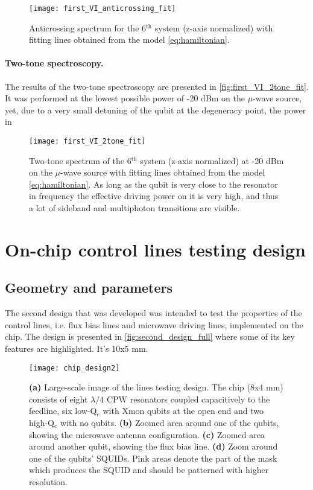\documentclass[12pt, twoside]{report}
\numberwithin{equation}{section}
\begin{document}
\begin{figure}
\centering
\texttt{[image: first\_VI\_anticrossing\_fit]}
\caption{Anticrossing spectrum for the 6$^\text{th}$ system (z-axis normalized) with fitting lines obtained from the model \eqref{eq:hamiltonian}. }
\label{fig:first_VI_anticrossing_fit}
\end{figure}

\paragraph{Two-tone spectroscopy.} The results of the two-tone spectroscopy are presented in \autoref{fig:first_VI_2tone_fit}. It was performed at the lowest possible power of -20 dBm on the $\mu$-wave source, yet, due to a very small detuning of the qubit at the degeneracy point, the power in

\begin{figure}
\centering
\texttt{[image: first\_VI\_2tone\_fit]}
\caption{Two-tone spectrum of the 6$^\text{th}$ system (z-axis normalized) at -20 dBm on the $\mu$-wave source with fitting lines obtained from the model \eqref{eq:hamiltonian}. As long as the qubit is very close to the resonator in frequency the effective driving power on it is very high, and thus a lot of sideband and multiphoton transitions are visible.}
\label{fig:first_VI_2tone_fit}
\end{figure}

\newpage

\section{On-chip control lines testing design}

\subsection{Geometry and parameters}

The second design that was developed was intended to test the properties of the control lines, i.e. flux bias lines and microwave driving lines, implemented on the chip. The design is presented in \autoref{fig:second_design_full} where some of its key features are highlighted. It's 10x5 mm.

\begin{figure}[h!]
\centering
\texttt{[image: chip\_design2]}
\caption{\textbf{(a)} Large-scale image of the lines testing design. The chip (8x4 mm) consists of eight $\lambda/4$ CPW resonators coupled capacitively to the feedline, six low-Q$_e$ with Xmon qubits at the open end and two high-Q$_e$ with no qubits. \textbf{(b)} Zoomed area around one of the qubits, showing the microwave antenna configuration. \textbf{(c)} Zoomed area around another qubit, showing the flux bias line. \textbf{(d)} Zoom around one of the qubits' SQUIDs. Pink areas denote the part of the mask which produces the SQUID and should be patterned with higher resolution.}
\label{fig:second_design_full}
\end{figure}
\end{document}
